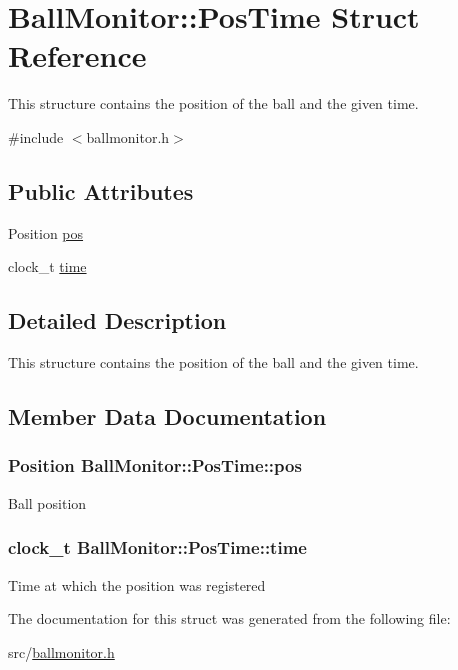 \hypertarget{structBallMonitor_1_1PosTime}{
\section{BallMonitor::PosTime Struct Reference}
\label{structBallMonitor_1_1PosTime}
}


This structure contains the position of the ball and the given time.  




{\ttfamily \#include $<$ballmonitor.h$>$}

\subsection*{Public Attributes}
\begin{DoxyCompactItemize}
\item 
Position \hyperlink{structBallMonitor_1_1PosTime_ae049de4ada401c92ec560198e5947e59}{pos}
\item 
clock\_\-t \hyperlink{structBallMonitor_1_1PosTime_ae56e28b26f0d91d164d5bfe0b0644cb2}{time}
\end{DoxyCompactItemize}


\subsection{Detailed Description}
This structure contains the position of the ball and the given time. 

\subsection{Member Data Documentation}
\hypertarget{structBallMonitor_1_1PosTime_ae049de4ada401c92ec560198e5947e59}{
\subsubsection[{pos}]{\setlength{\rightskip}{0pt plus 5cm}Position {\bf BallMonitor::PosTime::pos}}}
\label{structBallMonitor_1_1PosTime_ae049de4ada401c92ec560198e5947e59}
Ball position \hypertarget{structBallMonitor_1_1PosTime_ae56e28b26f0d91d164d5bfe0b0644cb2}{
\subsubsection[{time}]{\setlength{\rightskip}{0pt plus 5cm}clock\_\-t {\bf BallMonitor::PosTime::time}}}
\label{structBallMonitor_1_1PosTime_ae56e28b26f0d91d164d5bfe0b0644cb2}
Time at which the position was registered 

The documentation for this struct was generated from the following file:\begin{DoxyCompactItemize}
\item 
src/\hyperlink{ballmonitor_8h}{ballmonitor.h}\end{DoxyCompactItemize}
